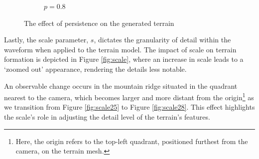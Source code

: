 \documentclass[12pt]{article}
\begin{document}
\begin{figure}[ht]
\begin{subfigure}{0.3\textwidth}
        \caption{$p=0.8$}
        \label{fig:persistence0.8}
    \end{subfigure}
    \caption{The effect of persistence on the generated terrain}
    \label{fig:persistence}
\end{figure}

Lastly, the scale parameter, \(s\), dictates the granularity of detail within the waveform when applied to the terrain model. The impact of scale on terrain formation is depicted in Figure \ref{fig:scale}, where an increase in scale leads to a `zoomed out' appearance, rendering the details less notable.

An observable change occurs in the mountain ridge situated in the quadrant nearest to the camera, which becomes larger and more distant from the origin\footnote{Here, the origin refers to the top-left quadrant, positioned furthest from the camera, on the terrain mesh.} as we transition from Figure \ref{fig:scale25} to Figure \ref{fig:scale28}. This effect highlights the scale's role in adjusting the detail level of the terrain's features.
\end{document}
